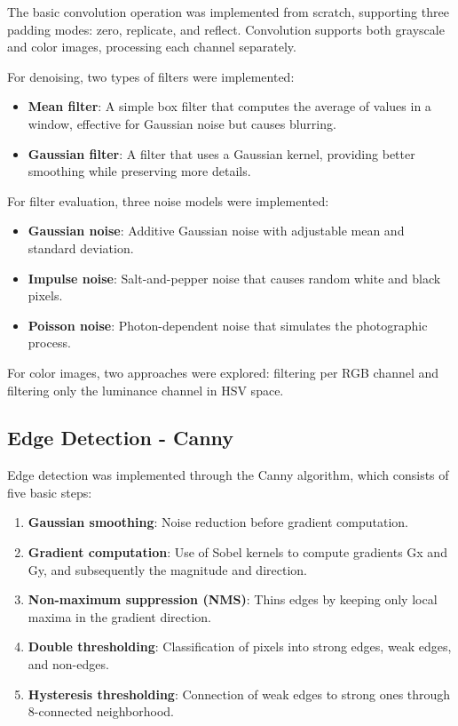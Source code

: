 \documentclass{article}
\begin{document}
The basic convolution operation was implemented from scratch, supporting three padding modes: zero, replicate, and reflect. Convolution supports both grayscale and color images, processing each channel separately.

For denoising, two types of filters were implemented:
\begin{itemize}
    \item \textbf{Mean filter}: A simple box filter that computes the average of values in a window, effective for Gaussian noise but causes blurring.
    \item \textbf{Gaussian filter}: A filter that uses a Gaussian kernel, providing better smoothing while preserving more details.
\end{itemize}

For filter evaluation, three noise models were implemented:
\begin{itemize}
    \item \textbf{Gaussian noise}: Additive Gaussian noise with adjustable mean and standard deviation.
    \item \textbf{Impulse noise}: Salt-and-pepper noise that causes random white and black pixels.
    \item \textbf{Poisson noise}: Photon-dependent noise that simulates the photographic process.
\end{itemize}

For color images, two approaches were explored: filtering per RGB channel and filtering only the luminance channel in HSV space.

\subsection{Edge Detection - Canny}

Edge detection was implemented through the Canny algorithm, which consists of five basic steps:

\begin{enumerate}
    \item \textbf{Gaussian smoothing}: Noise reduction before gradient computation.
    \item \textbf{Gradient computation}: Use of Sobel kernels to compute gradients Gx and Gy, and subsequently the magnitude and direction.
    \item \textbf{Non-maximum suppression (NMS)}: Thins edges by keeping only local maxima in the gradient direction.
    \item \textbf{Double thresholding}: Classification of pixels into strong edges, weak edges, and non-edges.
    \item \textbf{Hysteresis thresholding}: Connection of weak edges to strong ones through 8-connected neighborhood.
\end{enumerate}
\end{document}
